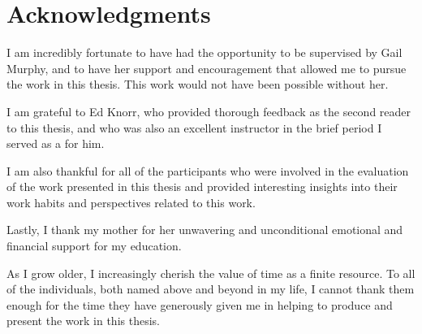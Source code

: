 
\chapter{Acknowledgments}

I am incredibly fortunate to have had the opportunity to be supervised by Gail Murphy,
and to have her support and encouragement that allowed me to pursue the work in this thesis.
This work would not have been possible without her.

I am grateful to Ed Knorr, who provided thorough feedback as the second reader to this thesis,
and who was also an excellent instructor in the brief period I served as a  for him.

I am also thankful for all of the participants who were involved in the evaluation of the work presented in this thesis
and provided interesting insights into their work habits and perspectives related to this work.

Lastly, I thank my mother for her unwavering and unconditional emotional and financial support for my education.

As I grow older, I increasingly cherish the value of time as a finite resource.
To all of the individuals, both named above and beyond in my life,
I cannot thank them enough for the time they have generously given me in helping to produce and present the work in this thesis.